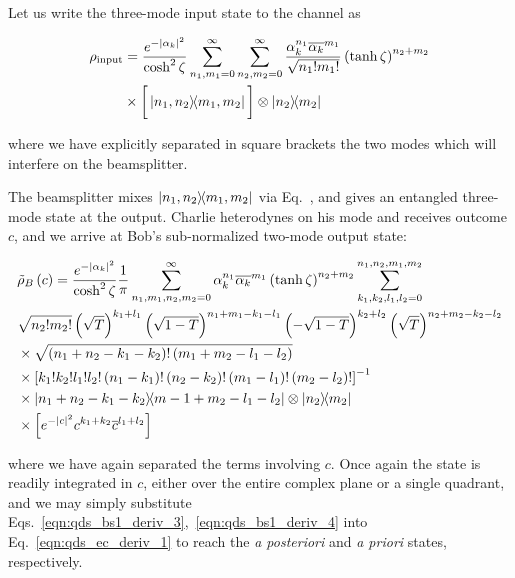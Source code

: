 \noindent Let us write the three-mode input state to the channel as

\begin{align}
\rho_{\text{input}} &= \frac{e^{-\left|\alpha_k\right|^2}}{\cosh^2 \zeta} \sum_{n_1, m_1=0}^\infty \sum_{n_2, m_2=0}^{\infty} \frac{\alpha_k^{n_1} \overline{\alpha_k}^{m_1}}{\sqrt{n_1! m_1!}} \left(\tanh\zeta\right)^{n_2 + m_2} \notag \\
&\times \bigg[\dyad{n_1, n_2}{m_1, m_2}\bigg] \otimes \dyad{n_2}{m_2}
\end{align}

\noindent where we have explicitly separated in square brackets the two modes which will interfere on the beamsplitter.

The beamsplitter mixes $\dyad{n_1, n_2}{m_1, m_2}$ via Eq.~, and gives an entangled three-mode state at the output. Charlie heterodynes on his mode and receives outcome $c$, and we arrive at Bob's sub-normalized two-mode output state:

\begin{align}\label{eqn:qds_ec_deriv_1}
&\tilde{\rho}_{B}\left(c\right) =  \frac{e^{-\left|\alpha_k\right|^2}}{\cosh^2\zeta} \frac{1}{\pi} \sum_{n_1, m_1, n_2, m_2 = 0}^\infty \alpha_k^{n_1} \overline{\alpha_k}^{m_1} \left(\tanh\zeta\right)^{n_2 + m_2} \sum_{k_1, k_2, l_1, l_2 = 0}^{n_1, n_2, m_1, m_2}  \notag \\
%
&\sqrt{n_2! m_2!} \left(\sqrt{T}\right)^{k_1 + l_1} \left(\sqrt{1-T}\right)^{n_1 + m_1 - k_1 - l_1} \left(-\sqrt{1-T}\right)^{k_2 + l_2} \left(\sqrt{T}\right)^{n_2 + m_2 - k_2 - l_2} \notag \\
%
&\times \sqrt{\left(n_1 + n_2 - k_1 - k_2\right)! \left(m_1 + m_2 - l_1 - l_2\right)} \notag \\
%
&\times \left[k_1! k_2! l_1! l_2! \left(n_1 - k_1\right)! \left(n_2 - k_2\right)! \left(m_1 - l_1\right)! \left(m_2 - l_2\right)! \right]^{-1} \notag \\
%
&\times \dyad{n_1 + n_2 - k_1 - k_2}{m-1 + m_2 - l_1 - l_2} \otimes \dyad{n_2}{m_2} \notag \\
%
&\times \left[e^{-\left|c\right|^2} c^{k_1 + k_2} \overline{c}^{l_1 + l_2} \right]
\end{align}

\noindent where we have again separated the terms involving $c$. Once again the state is readily integrated in $c$, either over the entire complex plane or a single quadrant, and we may simply substitute Eqs.~\ref{eqn:qds_bs1_deriv_3},~\ref{eqn:qds_bs1_deriv_4} into Eq.~\ref{eqn:qds_ec_deriv_1} to reach the \emph{a posteriori} and \emph{a priori} states, respectively.

